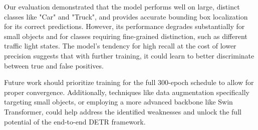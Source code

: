 \documentclass[10pt, conference]{IEEEtran}
\begin{document}
Our evaluation demonstrated that the model performs well on large, distinct classes like "Car" and "Truck", and provides accurate bounding box localization for its correct predictions. However, its performance degrades substantially for small objects and for classes requiring fine-grained distinction, such as different traffic light states. The model's tendency for high recall at the cost of lower precision suggests that with further training, it could learn to better discriminate between true and false positives.

Future work should prioritize training for the full 300-epoch schedule to allow for proper convergence. Additionally, techniques like data augmentation specifically targeting small objects, or employing a more advanced backbone like Swin Transformer, could help address the identified weaknesses and unlock the full potential of the end-to-end DETR framework.



\end{document}
